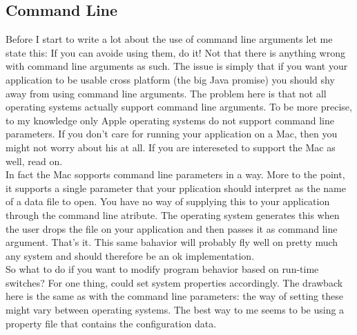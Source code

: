 \subsection{Command Line}

Before I start to write a lot about the use of command line arguments
let me state this: If you can avoide using them, do it! Not that there
is anything wrong with command line arguments as such. The issue is
simply that if you want your application to be usable cross platform
(the big Java promise) you should shy away from using command line
arguments. The problem here is that not all operating systems actually
support command line arguments. To be more precise, to my knowledge only
Apple operating systems do not support command line parameters. If you
don't care for running your application on a Mac, then you might not
worry about his at all. If you are intereseted to support the Mac as
well, read on.\\

In fact the Mac sopports command line parameters in a way. More to the
point, it supports a single parameter that your pplication should
interpret as the name of a data file to open. You have no way of
supplying this to your application through the command line atribute.
The operating system generates this when the user drops the file on your
application and then passes it as command line argument. That's it. This
same bahavior will probably fly well on pretty much any system and
should therefore be an ok implementation.\\

So what to do if you want to modify program behavior based on run-time
switches? For one thing,  could set system properties accordingly.
The drawback here is the same as with the command line parameters: the
way of setting these might vary between operating systems. The best way
to me seems to be using a property file that contains the configuration
data.\\
